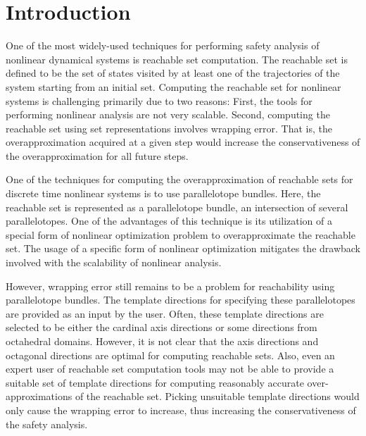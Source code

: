 
\section{Introduction}
\label{sec:intro}

One of the most widely-used techniques for performing safety analysis of nonlinear dynamical systems is reachable set computation.
%
The reachable set is defined to be the set of states visited by at least one of the trajectories of the system starting from an initial set.
%
Computing the reachable set for nonlinear systems is challenging primarily due to two reasons:
%
First, the tools for performing nonlinear analysis are not very scalable.
%
Second, computing the reachable set using set representations involves wrapping error.
%
That is, the overapproximation acquired at a given step would increase the conservativeness of the overapproximation for all future steps.

One of the techniques for computing the overapproximation of reachable sets for discrete time nonlinear systems is to use parallelotope bundles.
%
Here, the reachable set is represented as a parallelotope bundle, an intersection of several parallelotopes.
%
One of the advantages of this technique is its utilization of a special form of nonlinear optimization problem to overapproximate the reachable set.
%
The usage of a specific form of nonlinear optimization mitigates the drawback involved with the scalability of nonlinear analysis.

However, wrapping error still remains to be a problem for reachability using parallelotope bundles.
%
The template directions for specifying these parallelotopes are provided as an input by the user.
%
Often, these template directions are selected to be either the cardinal axis directions or some directions from octahedral domains.
%
However, it is not clear that the axis directions and octagonal directions are optimal for computing reachable sets.
%
Also, even an expert user of reachable set computation tools may not be able to provide a suitable set of template directions for computing reasonably accurate over-approximations of the reachable set.
%
Picking unsuitable template directions would only cause the wrapping error to increase, thus increasing the conservativeness of the safety analysis.

